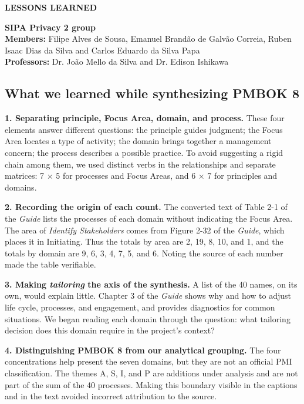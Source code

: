 \documentclass[12pt,a4paper,article,oneside,brazil,english]{abntex2}
\begin{document}
\SingleSpacing
\small
\linespread{1.04}\selectfont
\setlength{\parskip}{5pt plus 1pt}
\thispagestyle{plain}

\begin{center}\textbf{LESSONS LEARNED}\end{center}

\noindent \textbf{SIPA Privacy 2 group}\\ \textbf{Members:} Filipe Alves de Sousa, Emanuel Brandão de Galvão Correia, Ruben Isaac Dias da Silva and Carlos Eduardo da Silva Papa\\ \textbf{Professors:} Dr. João Mello da Silva and Dr. Edison Ishikawa

\subsection*{What we learned while synthesizing PMBOK 8}

\textbf{1. Separating principle, Focus Area, domain, and process.} These four elements answer different questions: the principle guides judgment; the Focus Area locates a type of activity; the domain brings together a management concern; the process describes a possible practice. To avoid suggesting a rigid chain among them, we used distinct verbs in the relationships and separate matrices: 7 \ensuremath{\times} 5 for processes and Focus Areas, and 6 \ensuremath{\times} 7 for principles and domains.

\textbf{2. Recording the origin of each count.} The converted text of Table 2-1 of the \textit{Guide} lists the processes of each domain without indicating the Focus Area. The area of \textit{Identify Stakeholders} comes from Figure 2-32 of the \textit{Guide}, which places it in Initiating. Thus the totals by area are 2, 19, 8, 10, and 1, and the totals by domain are 9, 6, 3, 4, 7, 5, and 6. Noting the source of each number made the table verifiable.

\textbf{3. Making \textit{tailoring} the axis of the synthesis.} A list of the 40 names, on its own, would explain little. Chapter 3 of the \textit{Guide} shows why and how to adjust life cycle, processes, and engagement, and provides diagnostics for common situations. We began reading each domain through the question: what tailoring decision does this domain require in the project's context?

\textbf{4. Distinguishing PMBOK 8 from our analytical grouping.} The four concentrations help present the seven domains, but they are not an official PMI classification. The themes A, S, I, and P are additions under analysis and are not part of the sum of the 40 processes. Making this boundary visible in the captions and in the text avoided incorrect attribution to the source.
\end{document}
